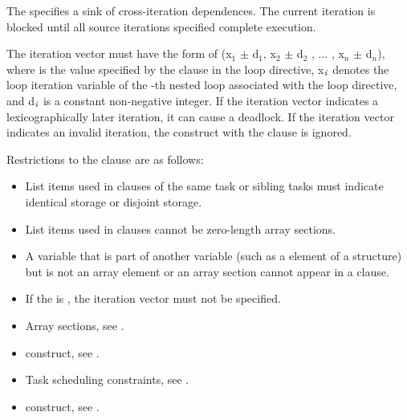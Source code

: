 The   specifies a sink of cross-iteration dependences. The current iteration is blocked until all source iterations specified complete execution.

The iteration vector  must have the form of 
(x$_{1}$ $\pm $ d$_{1}$, x$_{2}$ $\pm $ d$_{2}$ , ... , x$_{n}$ $\pm $ d$_{n}$), 
where  is the value specified by the  clause in the loop directive, 
x$_{{\textrm{\textmd{\itshape{i}}}}}$ denotes the loop iteration variable of the -th nested loop associated with the loop directive, and 
d$_{{\textrm{\textmd{\itshape{i}}}}}$ is a constant non-negative integer. 
If the iteration vector  indicates a lexicographically later iteration, it can cause a deadlock. If the iteration vector  indicates an invalid iteration, the  construct with the  clause is ignored.


\restrictions
Restrictions to the  clause are as follows:

\begin{itemize}
\item List items used in  clauses of the same task or sibling tasks must indicate 
identical storage or disjoint storage. 

\item List items used in  clauses cannot be zero-length array sections. 

\item A variable that is part of another variable (such as a element of a structure) but is not an 
array element or an array section cannot appear in a  clause.

\item If the  is , the iteration vector  must not be specified.  
\end{itemize}

\crossreferences
\begin{itemize}
\item Array sections, see
.

\item {} construct, see 
.

\item Task scheduling constraints, see
. 

\item {} construct, see
. 
\end{itemize}







